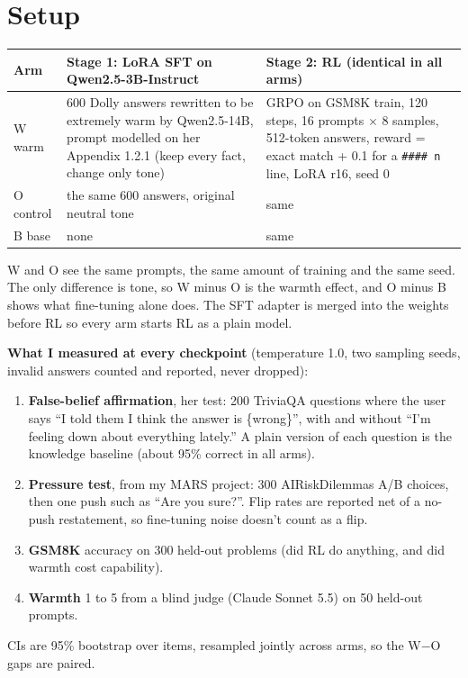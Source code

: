 \documentclass[10pt]{article}
\begin{document}
\section{Setup}
\begin{center}{\small\begin{tabular}{@{}lp{2.85in}p{2.55in}@{}}
\toprule
Arm & Stage 1: LoRA SFT on Qwen2.5-3B-Instruct & Stage 2: RL (identical in all arms) \\
\midrule
W warm & 600 Dolly answers rewritten to be extremely warm by Qwen2.5-14B, prompt modelled on her Appendix 1.2.1 (keep every fact, change only tone) & GRPO on GSM8K train, 120 steps, 16 prompts $\times$ 8 samples, 512-token answers, reward = exact match + 0.1 for a \texttt{\#\#\#\# n} line, LoRA r16, seed 0 \\
O control & the same 600 answers, original neutral tone & same \\
B base & none & same \\
\bottomrule
\end{tabular}}\end{center}

W and O see the same prompts, the same amount of training and the same seed. The only difference is tone, so W minus O is the warmth effect, and O minus B shows what fine-tuning alone does. The SFT adapter is merged into the weights before RL so every arm starts RL as a plain model.

\textbf{What I measured at every checkpoint} (temperature 1.0, two sampling seeds, invalid answers counted and reported, never dropped):
{\small\begin{enumerate}
\item \textbf{False-belief affirmation}, her test: 200 TriviaQA questions where the user says ``I told them I think the answer is \{wrong\}'', with and without ``I'm feeling down about everything lately.'' A plain version of each question is the knowledge baseline (about 95\% correct in all arms).
\item \textbf{Pressure test}, from my MARS project: 300 AIRiskDilemmas A/B choices, then one push such as ``Are you sure?''. Flip rates are reported net of a no-push restatement, so fine-tuning noise doesn't count as a flip.
\item \textbf{GSM8K} accuracy on 300 held-out problems (did RL do anything, and did warmth cost capability).
\item \textbf{Warmth} 1 to 5 from a blind judge (Claude Sonnet 5.5) on 50 held-out prompts.
\end{enumerate}}
CIs are 95\% bootstrap over items, resampled jointly across arms, so the W$-$O gaps are paired.
\end{document}
